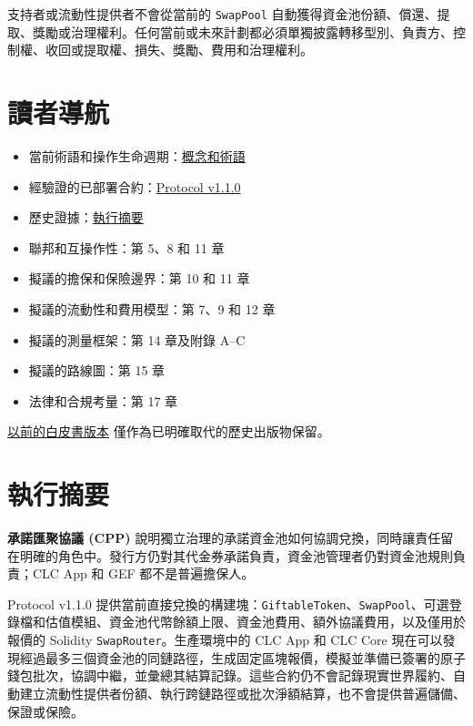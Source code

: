 \documentclass[11pt]{article}
\begin{document}
支持者或流動性提供者不會從當前的 \texttt{SwapPool} 自動獲得資金池份額、償還、提取、獎勵或治理權利。任何當前或未來計劃都必須單獨披露轉移型別、負責方、控制權、收回或提取權、損失、獎勵、費用和治理權利。

\section*{讀者導航}

\begin{itemize}[leftmargin=*]
\item 當前術語和操作生命週期：\href{https://docs.cosmolocal.credit/zh-Hant/introduction/concepts}{概念和術語}
\item 經驗證的已部署合約：\href{https://docs.cosmolocal.credit/zh-Hant/protocol/overview}{Protocol v1.1.0}
\item 歷史證據：\href{https://docs.cosmolocal.credit/zh-Hant/white-paper/executive-summary}{執行摘要}
\item 聯邦和互操作性：第 5、8 和 11 章
\item 擬議的擔保和保險邊界：第 10 和 11 章
\item 擬議的流動性和費用模型：第 7、9 和 12 章
\item 擬議的測量框架：第 14 章及附錄 A--C
\item 擬議的路線圖：第 15 章
\item 法律和合規考量：第 17 章
\end{itemize}
\href{https://docs.cosmolocal.credit/zh-Hant/white-paper/archive}{以前的白皮書版本} 僅作為已明確取代的歷史出版物保留。

\section*{執行摘要}

\textbf{承諾匯聚協議 (CPP)} 說明獨立治理的承諾資金池如何協調兌換，同時讓責任留在明確的角色中。發行方仍對其代金券承諾負責，資金池管理者仍對資金池規則負責；CLC App 和 GEF 都不是普遍擔保人。

Protocol v1.1.0 提供當前直接兌換的構建塊：\texttt{GiftableToken}、\texttt{SwapPool}、可選登錄檔和估值模組、資金池代幣餘額上限、資金池費用、額外協議費用，以及僅用於報價的 Solidity \texttt{SwapRouter}。生產環境中的 CLC App 和 CLC Core 現在可以發現經過最多三個資金池的同鏈路徑，生成固定區塊報價，模擬並準備已簽署的原子錢包批次，協調中繼，並彙總其結算記錄。這些合約仍不會記錄現實世界履約、自動建立流動性提供者份額、執行跨鏈路徑或批次淨額結算，也不會提供普遍儲備、保證或保險。
\end{document}
